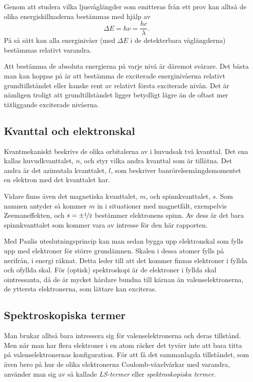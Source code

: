 \documentclass[11pt,a4paper]{article}
\begin{document}
 
Genom att studera vilka ljusvåglängder som emitteras från ett prov
kan alltså de olika energiskillnaderna bestämmas med hjälp av  
\[\Delta E = h\nu=\frac{hc}{\lambda}.\]
På så sätt kan alla energinivåer (med $\Delta E$ i de detekterbara
våglängderna) bestämmas relativt varandra. 

Att bestämma de absoluta
energierna på varje nivå är däremot svårare. Det bästa man kan hoppas
på är att bestämma de exciterade energinivåerna relativt
grundtillståndet eller kanske rent av relativt första exciterade
nivån. Det är nämligen troligt att grundtillståndet ligger betydligt
lägre än de oftast mer tätliggande exciterade nivåerna. 

\subsection{Kvanttal och elektronskal}
Kvantmekaniskt beskrivs de olika orbitalerna av i huvudsak två
kvanttal. Det ena kallas huvudkvanttalet, $n$, och styr vilka andra
kvanttal som är tillåtna. Det andra är det azimutala kvanttalet, $l$,
som beskriver banrörelsemängdsmomentet en elektron med det kvanttalet
har. 

Vidare finns även det magnetiska kvanttalet, $m$, och spinnkvanttalet,
$s$. Som namnen antyder så kommer $m$ in i situationer med magnetfält,
exempelvis Zeemaneffekten, och $s=\pm\nicefrac{1}{2}$ bestämmer
elektronens spinn. 
Av dess är det bara spinnkvanttalet som kommer vara av intresse för
den här rapporten.  

Med Paulis uteslutningsprincip kan man sedan bygga upp elektronskal
som fylls upp med elektroner för större grundämnen. Skalen i dessa
atomer fylls på nerifrån, i energi räknat. Detta leder till att det
kommer finnas elektroner i fyllda och ofyllda skal. För (optisk)
spektroskopi är de elektroner i fyllda skal ointressanta, då de är
mycket hårdare bundna till kärnan än valenselektronerna, de yttersta
elektronerna, som lättare kan exciteras. 



\subsection{Spektroskopiska termer}\label{sec:term}
Man brukar alltså bara intressera sig för valenselektronerna och deras
tillstånd. Men när man har flera elektroner i en atom räcker det
tyvärr inte att bara titta på valenselektronernas konfiguration. För att
få det sammanlagda tillståndet, som även bero på hur de olika
elektronerna Coulomb-växelvärkar med varandra, använder man sig av så
kallade \emph{LS-termer} eller \emph{spektroskopiska termer}.
\end{document}

